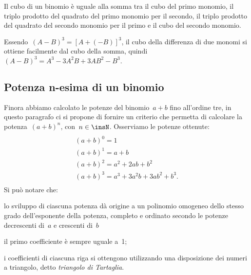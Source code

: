\osservazione Il cubo di un binomio è uguale alla somma tra il
cubo del primo monomio, il triplo prodotto del quadrato del primo
monomio per il secondo, il triplo prodotto del quadrato del secondo
monomio per il primo e il cubo del secondo monomio.

Essendo~$\left(A-B\right)^{3}=\left[A+\left(-B\right)\right]^{3}$, il
cubo della differenza di due monomi si ottiene facilmente dal cubo
della somma, quindi
$\left(A-B\right)^{3}=A^{3}-3A^{2}B+3{AB}^{2}-B^{3}$.


\subsection{Potenza n-esima di un binomio}
\label{subsec:11_prodnot_potenzabinomio}

Finora abbiamo calcolato le potenze del binomio~$a+b$ fino
all'ordine tre, in questo paragrafo ci si propone di
fornire un criterio che permetta di calcolare la potenza~$(a+b)^{n}$,
con~$n\in \insN$. Osserviamo le potenze ottenute:
\begin{multline*}
\\(a+b)^{0}=1\\
(a+b)^{1}=a+b\\
(a+b)^{2}=a^{2}+2{ab}+b^{2}\\
(a+b)^{3}=a^{3}+3a^{2}b+3{ab}^{2}+b^{3}.\\
\end{multline*}
Si può notare che:

\begin{itemize*}
\item lo sviluppo di ciascuna potenza dà origine a un polinomio
omogeneo dello stesso grado dell'esponente della
potenza, completo e ordinato secondo le potenze decrescenti di~$a$ e 
crescenti di~$b$
\item il primo coefficiente è sempre uguale a~1;
\item i coefficienti di ciascuna riga si ottengono utilizzando una
disposizione dei numeri a triangolo, detto \emph{triangolo di Tartaglia}.
\end{itemize*}

\begin{inaccessibleblock}
\begin{minipage}[t]{.49\textwidth}
 \centering 
\end{minipage}
\hfil
 \begin{minipage}[t]{.49\textwidth}
 \centering 
\end{minipage}
\end{inaccessibleblock}

